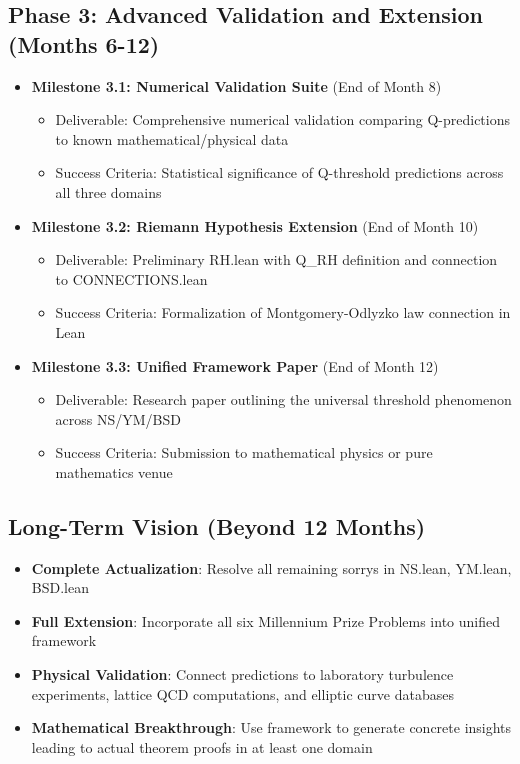 \documentclass[11pt]{article}
\begin{document}
\subsection{Phase 3: Advanced Validation and Extension (Months 6-12)}
\begin{itemize}
\item \textbf{Milestone 3.1: Numerical Validation Suite} (End of Month 8)
  \begin{itemize}
  \item Deliverable: Comprehensive numerical validation comparing Q-predictions to known mathematical/physical data
  \item Success Criteria: Statistical significance of Q-threshold predictions across all three domains
  \end{itemize}
\item \textbf{Milestone 3.2: Riemann Hypothesis Extension} (End of Month 10)
  \begin{itemize}
  \item Deliverable: Preliminary RH.lean with Q\_RH definition and connection to CONNECTIONS.lean
  \item Success Criteria: Formalization of Montgomery-Odlyzko law connection in Lean
  \end{itemize}
\item \textbf{Milestone 3.3: Unified Framework Paper} (End of Month 12)
  \begin{itemize}
  \item Deliverable: Research paper outlining the universal threshold phenomenon across NS/YM/BSD
  \item Success Criteria: Submission to mathematical physics or pure mathematics venue
  \end{itemize}
\end{itemize}

\subsection{Long-Term Vision (Beyond 12 Months)}
\begin{itemize}
\item \textbf{Complete Actualization}: Resolve all remaining sorrys in NS.lean, YM.lean, BSD.lean
\item \textbf{Full Extension}: Incorporate all six Millennium Prize Problems into unified framework
\item \textbf{Physical Validation}: Connect predictions to laboratory turbulence experiments, lattice QCD computations, and elliptic curve databases
\item \textbf{Mathematical Breakthrough}: Use framework to generate concrete insights leading to actual theorem proofs in at least one domain
\end{itemize}
\end{document}
